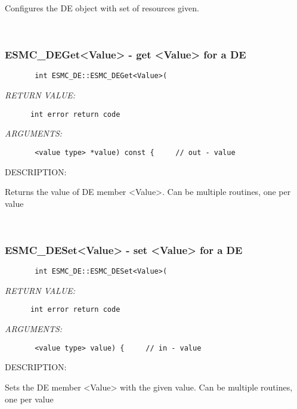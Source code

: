       Configures the DE object with set of resources given.
   
 
\mbox{}\hrulefill\ 
 
\subsubsection{ESMC\_DEGet<Value> - get <Value> for a DE}


  
\begin{verbatim}       int ESMC_DE::ESMC_DEGet<Value>(\end{verbatim}{\em RETURN VALUE:}
\begin{verbatim}      int error return code\end{verbatim}{\em ARGUMENTS:}
\begin{verbatim}       <value type> *value) const {     // out - value\end{verbatim}
{\sf DESCRIPTION:\\ }


       Returns the value of DE member <Value>.
       Can be multiple routines, one per value
   
 
\mbox{}\hrulefill\ 
 
\subsubsection{ESMC\_DESet<Value> - set <Value> for a DE}


  
\begin{verbatim}       int ESMC_DE::ESMC_DESet<Value>(\end{verbatim}{\em RETURN VALUE:}
\begin{verbatim}      int error return code\end{verbatim}{\em ARGUMENTS:}
\begin{verbatim}       <value type> value) {     // in - value\end{verbatim}
{\sf DESCRIPTION:\\ }


       Sets the DE member <Value> with the given value.
       Can be multiple routines, one per value
   
 
